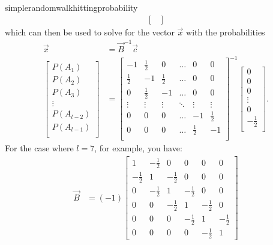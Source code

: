 \begin{answer}{simplerandomwalkhittingprobability}
\begin{align*}
\begin{bmatrix}
  \end{bmatrix}
\end{align*}
which can then be used to solve for the vector $\vec{x}$ with the probabilities
\begin{align*}
\vec{x} &= \vec{B}^{-1}\vec{c} \\
  \begin{bmatrix}
  P(A_1) \\
  P(A_2) \\
  P(A_3) \\
  \vdots \\
  P(A_{l-2}) \\
  P(A_{l-1}) \\
  \end{bmatrix}
  &=
  \begin{bmatrix}
 -1           & \frac{1}{2}  & 0            &   \ldots       & 0            & 0            \\
 \frac{1}{2}  & -1           & \frac{1}{2}  &   \ldots       & 0            & 0            \\
 0            & \frac{1}{2}  & -1           &   \ldots       & 0            & 0            \\
  \vdots      & \vdots       & \vdots       &   \ddots       & \vdots       & \vdots       \\
 0            & 0            & 0            &   \ldots       & -1           & \frac{1}{2}  \\
 0            & 0            & 0            &   \ldots       & \frac{1}{2}  & -1           \\
  \end{bmatrix}^{-1}
  \begin{bmatrix}
    0 \\ 0 \\ 0 \\ \vdots \\ 0 \\ -\frac{1}{2} \\
  \end{bmatrix}
\text{.}
\end{align*}
For the case where $l=7$, for example, you have:
\begin{align*}
\vec{B} &=
(-1)
\left[\begin{matrix}1 & - \frac{1}{2} & 0 & 0 & 0 & 0\\- \frac{1}{2} & 1 & - \frac{1}{2} & 0 & 0 & 0\\0 & - \frac{1}{2} & 1 & - \frac{1}{2} & 0 & 0\\0 & 0 & - \frac{1}{2} & 1 & - \frac{1}{2} & 0\\0 & 0 & 0 & - \frac{1}{2} & 1 & - \frac{1}{2}\\0 & 0 & 0 & 0 & - \frac{1}{2} & 1\end{matrix}\right]

\end{align*}
\end{answer}
